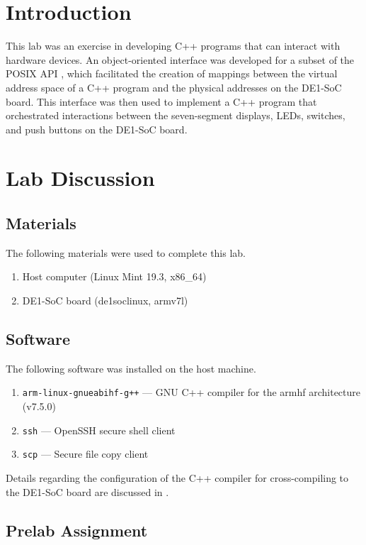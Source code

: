 \documentclass[11pt, letterpaper]{article} %
\begin{document}
\makelabtitle

\section*{Introduction}
This lab was an exercise in developing C++ programs that can interact with hardware devices.
An object-oriented interface was developed for a subset of the POSIX API \cite{wiki:posix}, which facilitated the creation of mappings between the virtual address space of a C++ program and the physical addresses on the DE1-SoC board. This interface was then used to implement a C++ program that orchestrated interactions between the seven-segment displays, LEDs, switches, and push buttons on the DE1-SoC board.


\section*{Lab Discussion}

\subsection*{Materials}

The following materials were used to complete this lab.
\begin{enumerate}
    \item Host computer (Linux Mint 19.3, x86\_64)
    \item DE1-SoC board (de1soclinux, armv7l)
\end{enumerate}

\subsection*{Software}
The following software was installed on the host machine.
\begin{enumerate}
    \item \texttt{arm-linux-gnueabihf-g++} --- GNU C++ compiler for the armhf architecture (v7.5.0)
    \item \texttt{ssh} --- OpenSSH secure shell client
    \item \texttt{scp} --- Secure file copy client
\end{enumerate}

Details regarding the configuration of the C++ compiler for cross-compiling to the DE1-SoC board are discussed in \cite{report-0}.

\subsection*{Prelab Assignment}
\end{document}
